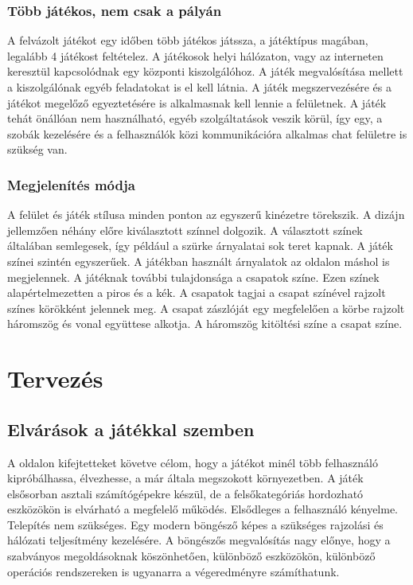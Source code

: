 \documentclass[bibliography=totocnumbered]{article}
\begin{document}
\subsubsection{Több játékos, nem csak a
pályán}

A felvázolt játékot egy időben több játékos játssza, a játéktípus
magában, legalább 4 játékost feltételez. A játékosok helyi hálózaton,
vagy az interneten keresztül kapcsolódnak egy központi kiszolgálóhoz. A
játék megvalósítása mellett a kiszolgálónak egyéb feladatokat is el kell
látnia. A játék megszervezésére és a játékot megelőző egyeztetésére is
alkalmasnak kell lennie a felületnek. A játék tehát önállóan nem
használható, egyéb szolgáltatások veszik körül, így egy, a szobák
kezelésére és a felhasználók közi kommunikációra alkalmas chat felületre
is szükség van.


\subsubsection{Megjelenítés módja}

A felület és játék stílusa minden ponton az egyszerű kinézetre
törekszik. A dizájn jellemzően néhány előre kiválasztott színnel
dolgozik. A választott színek általában semlegesek, így például a szürke
árnyalatai sok teret kapnak. A játék színei szintén egyszerűek. A
játékban használt árnyalatok az oldalon máshol is megjelennek. A
játéknak további tulajdonsága a csapatok színe. Ezen színek
alapértelmezetten a piros és a kék. A csapatok tagjai a csapat színével
rajzolt színes körökként jelennek meg. A csapat zászlóját egy
megfelelően a körbe rajzolt háromszög és vonal együttese alkotja. A
háromszög kitöltési színe a csapat színe.


\section{Tervezés}


\subsection{Elvárások a játékkal
szemben}

A \pageref{jatek} oldalon kifejtetteket követve célom, hogy a játékot minél több felhasználó kipróbálhassa,
élvezhesse, a már általa megszokott környezetben. A játék elsősorban
asztali számítógépekre készül, de a felsőkategóriás hordozható
eszközökön is elvárható a megfelelő működés. Elsődleges a felhasználó
kényelme. Telepítés nem szükséges. Egy modern böngésző képes a szükséges
rajzolási és hálózati teljesítmény kezelésére. A böngészős megvalósítás
nagy előnye, hogy a szabványos megoldásoknak köszönhetően, különböző
eszközökön, különböző operációs rendszereken is ugyanarra a
végeredményre számíthatunk.
\end{document}
